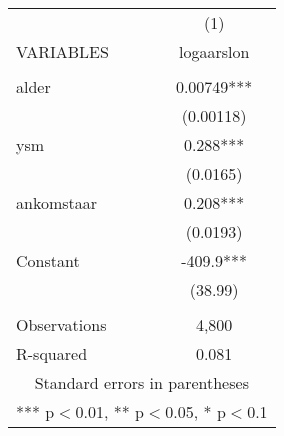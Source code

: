 \documentclass[]{article}
\begin{document}
\begin{tabular}{lc} \hline
 & (1) \\
VARIABLES & logaarslon \\ \hline
 &  \\
alder & 0.00749*** \\
 & (0.00118) \\
ysm & 0.288*** \\
 & (0.0165) \\
ankomstaar & 0.208*** \\
 & (0.0193) \\
Constant & -409.9*** \\
 & (38.99) \\
 &  \\
Observations & 4,800 \\
 R-squared & 0.081 \\ \hline
\multicolumn{2}{c}{ Standard errors in parentheses} \\
\multicolumn{2}{c}{ *** p$<$0.01, ** p$<$0.05, * p$<$0.1} \\
\end{tabular}
\end{document}
